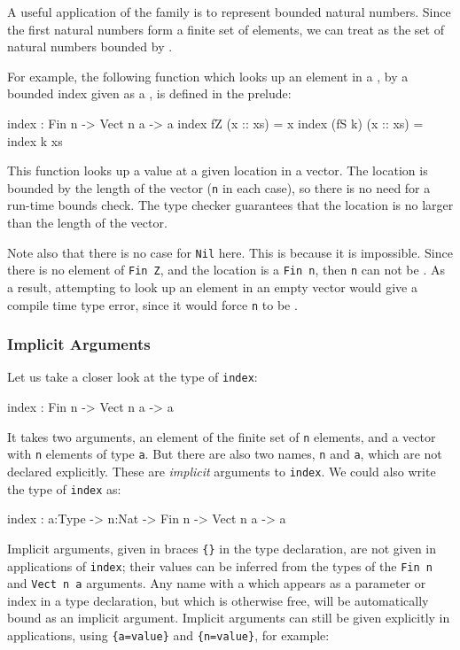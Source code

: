A useful application of the  family is to represent bounded natural numbers.
Since the first  natural numbers form a finite set of  elements, we can treat  as the set of natural numbers bounded by .

For example, the following function which looks up an element in a , by a bounded index given as a , is defined in the prelude:

\begin{code}
index : Fin n -> Vect n a -> a
index fZ     (x :: xs) = x
index (fS k) (x :: xs) = index k xs
\end{code}

\noindent
This function looks up a value at a given location in a vector.
The location is bounded by the length of the vector (\texttt{n} in each case), so there is no
need for a run-time bounds check.
The type checker guarantees that the location is no larger than the length of the vector.

Note also that there is no case for \texttt{Nil} here.
This is because it is impossible. Since there is no element of \texttt{Fin Z}, and the location is a \texttt{Fin n}, then \texttt{n} can not be .
As a result, attempting to look up an element in an empty vector would give a compile time type error, since it would force \texttt{n} to be .

\subsubsection{Implicit Arguments}

Let us take a closer look at the type of \texttt{index}:

\begin{code}
index : Fin n -> Vect n a -> a
\end{code}

\noindent
It takes two arguments, an element of the finite set of \texttt{n} elements, and a vector with \texttt{n} elements of type \texttt{a}. But there are also two names, \texttt{n} and \texttt{a}, which are not declared  explicitly.
These are \emph{implicit} arguments to \texttt{index}. We could also write the type of \texttt{index} as:

\begin{code}
index : {a:Type} -> {n:Nat} -> Fin n -> Vect n a -> a
\end{code}

\noindent
Implicit arguments, given in braces \texttt{\{\}} in the type declaration, are not given in applications of \texttt{index}; their values can be inferred from the types of the \texttt{Fin n} and \texttt{Vect n a} arguments.
Any name with a  which appears as a parameter or index in a type declaration, but which is otherwise free, will be automatically bound as an implicit argument.
Implicit arguments can still be given explicitly in applications, using \texttt{\{a=value\}} and \texttt{\{n=value\}}, for example:

